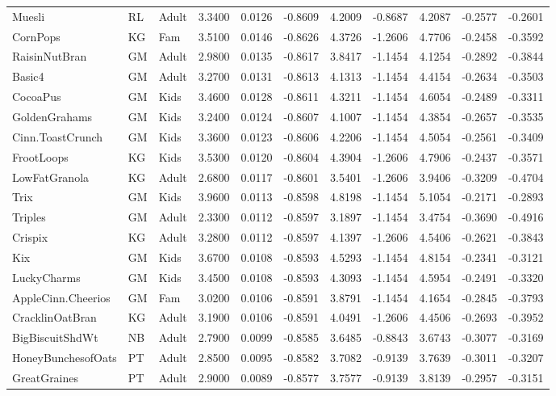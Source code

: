\begin{table}[!htbp]
\begin{tabular}{lllrrrrrrrr}
Muesli & RL & Adult & 3.3400 & 0.0126 & -0.8609 & 4.2009 & -0.8687 & 4.2087 & -0.2577 & -0.2601 \\
CornPops & KG & Fam & 3.5100 & 0.0146 & -0.8626 & 4.3726 & -1.2606 & 4.7706 & -0.2458 & -0.3592 \\
RaisinNutBran & GM & Adult & 2.9800 & 0.0135 & -0.8617 & 3.8417 & -1.1454 & 4.1254 & -0.2892 & -0.3844 \\
Basic4 & GM & Adult & 3.2700 & 0.0131 & -0.8613 & 4.1313 & -1.1454 & 4.4154 & -0.2634 & -0.3503 \\
CocoaPus & GM & Kids & 3.4600 & 0.0128 & -0.8611 & 4.3211 & -1.1454 & 4.6054 & -0.2489 & -0.3311 \\
GoldenGrahams & GM & Kids & 3.2400 & 0.0124 & -0.8607 & 4.1007 & -1.1454 & 4.3854 & -0.2657 & -0.3535 \\
Cinn.ToastCrunch & GM & Kids & 3.3600 & 0.0123 & -0.8606 & 4.2206 & -1.1454 & 4.5054 & -0.2561 & -0.3409 \\
FrootLoops & KG & Kids & 3.5300 & 0.0120 & -0.8604 & 4.3904 & -1.2606 & 4.7906 & -0.2437 & -0.3571 \\
LowFatGranola & KG & Adult & 2.6800 & 0.0117 & -0.8601 & 3.5401 & -1.2606 & 3.9406 & -0.3209 & -0.4704 \\
Trix & GM & Kids & 3.9600 & 0.0113 & -0.8598 & 4.8198 & -1.1454 & 5.1054 & -0.2171 & -0.2893 \\
Triples & GM & Adult & 2.3300 & 0.0112 & -0.8597 & 3.1897 & -1.1454 & 3.4754 & -0.3690 & -0.4916 \\
Crispix & KG & Adult & 3.2800 & 0.0112 & -0.8597 & 4.1397 & -1.2606 & 4.5406 & -0.2621 & -0.3843 \\
Kix & GM & Kids & 3.6700 & 0.0108 & -0.8593 & 4.5293 & -1.1454 & 4.8154 & -0.2341 & -0.3121 \\
LuckyCharms & GM & Kids & 3.4500 & 0.0108 & -0.8593 & 4.3093 & -1.1454 & 4.5954 & -0.2491 & -0.3320 \\
AppleCinn.Cheerios & GM & Fam & 3.0200 & 0.0106 & -0.8591 & 3.8791 & -1.1454 & 4.1654 & -0.2845 & -0.3793 \\
CracklinOatBran & KG & Adult & 3.1900 & 0.0106 & -0.8591 & 4.0491 & -1.2606 & 4.4506 & -0.2693 & -0.3952 \\
BigBiscuitShdWt & NB & Adult & 2.7900 & 0.0099 & -0.8585 & 3.6485 & -0.8843 & 3.6743 & -0.3077 & -0.3169 \\
HoneyBunchesofOats & PT & Adult & 2.8500 & 0.0095 & -0.8582 & 3.7082 & -0.9139 & 3.7639 & -0.3011 & -0.3207 \\
GreatGraines & PT & Adult & 2.9000 & 0.0089 & -0.8577 & 3.7577 & -0.9139 & 3.8139 & -0.2957 & -0.3151 \\

\end{tabular}
\end{table}
